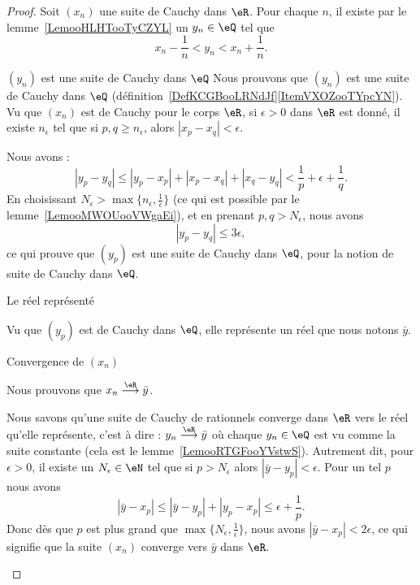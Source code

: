\begin{proof}
    Soit \( (x_n)\) une suite de Cauchy dans \( \eR\). Pour chaque \( n\), il existe par le lemme~\ref{LemooHLHTooTyCZYL} un \( y_n\in \eQ\) tel que
    \begin{equation}
        x_n-\frac{1}{ n }<y_n<x_n+\frac{1}{ n }.
    \end{equation}
    \begin{subproof}
        \item[\( (y_n)\) est une suite de Cauchy dans \( \eQ\)]
            Nous prouvons que \( (y_n)\) est une suite de Cauchy dans \( \eQ\) (définition~\ref{DefKCGBooLRNdJf}\ref{ItemVXOZooTYpcYN}). Vu que \( (x_n)\) est de Cauchy pour le corps \( \eR\), si \( \epsilon>0\) dans \( \eR\) est donné, il existe \( n_{\epsilon}\) tel que si \( p,q\geq n_{\epsilon}\), alors \( | x_p-x_q |<\epsilon\).

        Nous avons :
        \begin{equation}
            | y_p-y_q |\leq | y_p-x_p |+| x_p-x_q |+| x_q-y_q |<\frac{1}{ p }+\epsilon+\frac{1}{ q }.
        \end{equation}
        En choisissant \( N_{\epsilon}>\max\{ n_{\epsilon},\frac{1}{ \epsilon } \}\) (ce qui est possible par le lemme~\ref{LemooMWOUooVWgaEi}), et en prenant \( p,q>N_{\epsilon}\), nous avons
        \begin{equation}
            | y_p-y_q |\leq 3\epsilon,
        \end{equation}
        ce qui prouve que \( (y_p)\) est une suite de Cauchy dans \( \eQ\), pour la notion de suite de Cauchy dans \( \eQ\).

    \item[Le réel représenté]

        Vu que \( (y_p)\) est de Cauchy dans \( \eQ\), elle représente un réel que nous notons \( \bar y\).

    \item[Convergence de \( (x_n)\)]

        Nous prouvons que \(     x_n\stackrel{\eR}{\longrightarrow}\bar y \).

        Nous savons qu'une suite de Cauchy de rationnels converge dans \( \eR\) vers le réel qu'elle représente, c'est à dire : \( y_n\stackrel{\eR}{\longrightarrow}\bar y\) où chaque \( y_n\in \eQ\) est vu comme la suite constante (cela est le lemme~\ref{LemooRTGFooYVstwS}). Autrement dit, pour \( \epsilon>0\), il existe un \( N_{\epsilon}\in \eN\) tel que si \( p>N_{\epsilon}\) alors \( | \bar y-y_p |<\epsilon\). Pour un tel \( p\) nous avons
        \begin{equation}
            | \bar y-x_p |\leq| \bar y-y_p |+| y_p-x_p |\leq \epsilon+\frac{1}{ p }.
        \end{equation}
        Donc dès que \( p\) est plus grand que \( \max\{ N_{\epsilon},\frac{1}{ \epsilon } \}\), nous avons \( | \bar y-x_p |<2\epsilon\), ce qui signifie que la suite \( (x_n) \) converge vers \( \bar y\) dans \( \eR\).


\end{subproof}
\end{proof}

